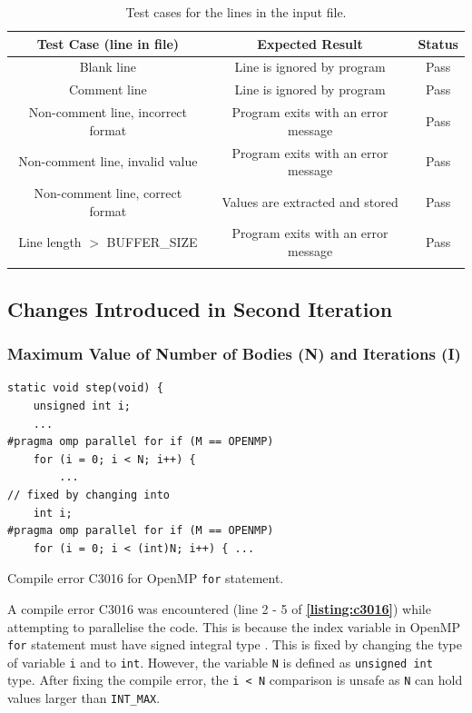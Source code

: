 \documentclass[12pt, a4paper]{article}
\let\oldcref\cref
\renewcommand{\cref}[1]{\textbf{\oldcref{#1}}}
\begin{document}
\renewcommand{\arraystretch}{1.3}
\begin{longtable}{|c|c|>{\columncolor{green}}c|}
  \hline \endfirsthead \rowcolor{lightgray}
  Test Case (line in file) & Expected Result & Status \\ \hline
  Blank line & Line is ignored by program & Pass \\ \hline
  Comment line & Line is ignored by program & Pass \\ \hline
  Non-comment line, incorrect format & Program exits with an error message & Pass \\ \hline
  Non-comment line, invalid value & Program exits with an error message & Pass \\ \hline
  Non-comment line, correct format & Values are extracted and stored  & Pass \\ \hline
  Line length $>$ BUFFER\_SIZE & Program exits with an error message & Pass \\ \hline
  \caption{Test cases for the lines in the input file.}
\end{longtable}
\renewcommand{\arraystretch}{1}

\subsection{Changes Introduced in Second Iteration}
\subsubsection{Maximum Value of Number of Bodies (N) and Iterations (I)} \label{subsec:c3016}
\begin{listing}[ht]
\begin{verbatim}
static void step(void) {
    unsigned int i;
    ...
#pragma omp parallel for if (M == OPENMP)
    for (i = 0; i < N; i++) {
        ...
// fixed by changing into
    int i;
#pragma omp parallel for if (M == OPENMP)
    for (i = 0; i < (int)N; i++) { ...
\end{verbatim}
\caption{Compile error C3016 \cite{c3016} for OpenMP \texttt{for} statement.}
\label{listing:c3016}
\end{listing}

A compile error C3016 was encountered (line 2 - 5 of \cref{listing:c3016}) while attempting to
parallelise the code. This is because the index variable in OpenMP \texttt{for} statement
must have signed integral type \cite{c3016}. This is fixed by changing the type of variable
\texttt{i} and  to \texttt{int}. However, the variable \texttt{N} is defined as
\texttt{unsigned int} type. After fixing the compile error, the \texttt{i < N}
comparison is unsafe as \texttt{N} can hold values larger than \texttt{INT\_MAX}.
\end{document}
